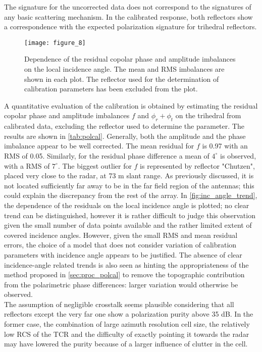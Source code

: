 The signature for the uncorrected data does not correspond to the signatures of any basic scattering mechanism. In the calibrated response, both reflectors show a correspondence with the expected polarization signature for trihedral reflectors.\\
\begin{figure*}[ht!]
	\centering
	\texttt{[image: figure\_8]}
	\caption{Dependence of the residual copolar phase and amplitude imbalances on the local incidence angle. The mean and RMS imbalances are shown in each plot. The reflector used for the determination of calibration parameters has been excluded from the plot.}
	\label{fig:inc_angle_trend}
\end{figure*}
A quantitative evaluation of the calibration is obtained by estimating the residual copolar phase and amplitude imbalances $f$ and $\phi_r + \phi_t$ on the trihedral from calibrated data, excluding the reflector used to determine the parameter. The results are shown in \autoref{tab:polcal}. Generally, both the amplitude and the phase imbalance appear to be well corrected. The mean residual for $f$ is 0.97 with an RMS of 0.05. Similarly, for the residual phase difference a mean of $4^\circ$ is observed, with a RMS of $7^\circ$. The biggest outlier for $f$ is represented by reflector "Chutzen", placed very close to the radar, at 73 m slant range. As previously discussed, it is not located sufficiently far away to be in the far field region of the antennas; this could explain the discrepancy from the rest of the array.
In \autoref{fig:inc_angle_trend}, the dependence of the residuals on the local incidence angle is plotted; no clear trend can be distinguished, however it is rather difficult to judge this observation given the small number of data points available and the rather limited extent of covered incidence angles. However, given the small RMS and mean residual errors, the choice of a model that does not consider variation of calibration parameters with incidence angle appears to be justified. The absence of clear incidence-angle related trends is also seen as hinting the appropriateness of the method proposed in \autoref{sec:proc_polcal} to remove the topographic contribution from the polarimetric phase differences: larger variation would otherwise be observed.\\
The assumption of negligible crosstalk seems plausible considering that all reflectors  except the very far one show a polarization purity above 35 dB. In the former case, the combination of large azimuth resolution cell size, the relatively low RCS of the TCR and  the difficulty of exactly pointing it towards the radar may have lowered the purity because of a larger influence of clutter in the cell.



